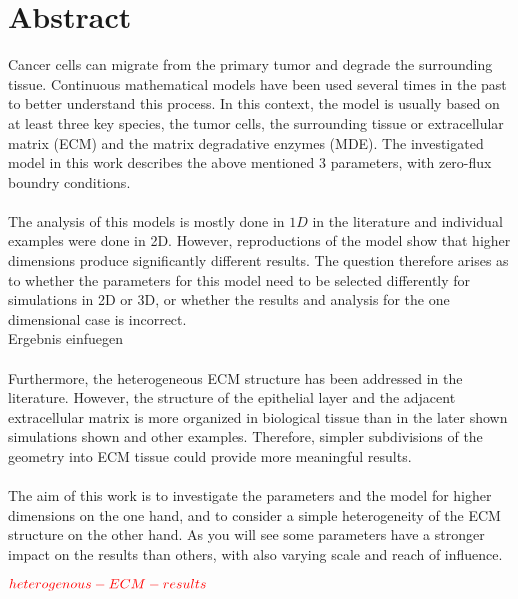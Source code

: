\clearpage
\section*{Abstract}
Cancer cells can migrate from the primary tumor and degrade the surrounding tissue. Continuous mathematical models have been used several times in the past to better understand this process. In this context, the model is usually based on at least three key species, the tumor cells, the surrounding tissue or extracellular matrix (ECM) and the matrix degradative enzymes (MDE). The investigated model in this work describes the above mentioned 3 parameters, with zero-flux boundry conditions. \\ \\
The analysis of this models is mostly done in $1D$ in the literature and individual examples were done in 2D. However, reproductions of the model show that higher dimensions produce significantly different results. The question therefore arises as to whether the parameters for this model need to 
be selected differently for simulations in 2D or 3D, or whether the results and analysis for the one dimensional case is incorrect. \\
Ergebnis einfuegen\\ \\
Furthermore, the heterogeneous ECM structure has been addressed in the literature. However, the structure of the epithelial layer and the adjacent extracellular matrix is more organized in biological tissue than in the later shown simulations shown and other examples. Therefore, simpler subdivisions of the geometry into ECM tissue could provide more meaningful results. \\ \\
The aim of this work is to investigate the parameters and the model for higher dimensions on the one hand, and to consider a simple heterogeneity of the ECM structure on the other hand. As you will see some parameters have a stronger impact on the results than others, with also varying scale and reach of influence.

$\textcolor{red}{heterogenous-ECM-results}$